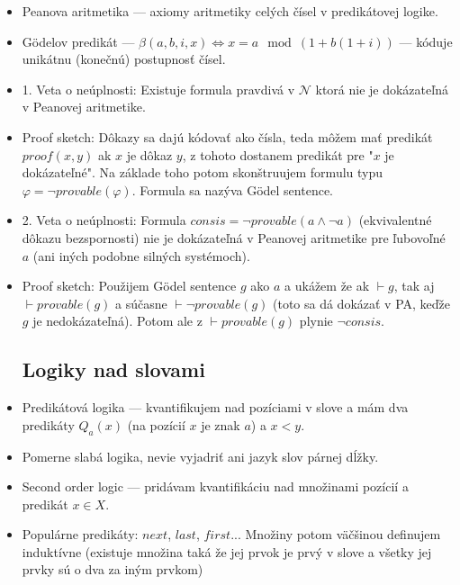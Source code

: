 \documentclass[paper=a4, fontsize=11pt]{scrartcl} %
\numberwithin{equation}{section} %
\numberwithin{figure}{section} %
\numberwithin{table}{section} %
\begin{document}
\begin{itemize}
	\item Peanova aritmetika — axiomy aritmetiky celých čísel v predikátovej logike.
	
	\item Gödelov predikát — $\beta(a, b, i, x) \iff x = a \mod (1 + b (1 + i))$ — kóduje unikátnu (konečnú) postupnosť čísel.
	
	\item 1. Veta o neúplnosti: Existuje formula pravdivá v $\mathcal{N}$ ktorá nie je dokázateľná v Peanovej aritmetike. 
	
	\item Proof sketch: Dôkazy sa dajú kódovať ako čísla, teda môžem mať predikát $proof(x, y)$ ak $x$ je dôkaz $y$, z tohoto dostanem predikát pre "$x$ je dokázateľné". Na základe toho potom skonštruujem formulu typu $\varphi = \neg provable(\varphi)$. Formula sa nazýva Gödel sentence.
	
	\item 2. Veta o neúplnosti: Formula $consis = \neg provable(a \land \neg a)$ (ekvivalentné dôkazu bezspornosti) nie je dokázateľná v Peanovej aritmetike pre ľubovoľné $a$ (ani iných podobne silných systémoch).
	
	\item Proof sketch: Použijem Gödel sentence $g$ ako $a$ a ukážem že ak $\vdash g$, tak aj $\vdash provable(g)$ a súčasne $\vdash \neg provable(g)$ (toto sa dá dokázať v PA, keďže $g$ je nedokázateľná). Potom ale z $\vdash provable(g)$ plynie $\neg consis$.
	
	\subsection{Logiky nad slovami}
	
	\item Predikátová logika — kvantifikujem nad pozíciami v slove a mám dva predikáty $Q_a(x)$ (na pozícií $x$ je znak $a$) a $x < y$.
	
	\item Pomerne slabá logika, nevie vyjadriť ani jazyk slov párnej dĺžky.
	
	\item Second order logic — pridávam kvantifikáciu nad množinami pozícií a predikát $x \in X$.
	
	\item Populárne predikáty: $next$, $last$, $first$... Množiny potom väčšinou definujem induktívne (existuje množina taká že jej prvok je prvý v slove a všetky jej prvky sú o dva za iným prvkom)
	

\end{itemize}
\end{document}
